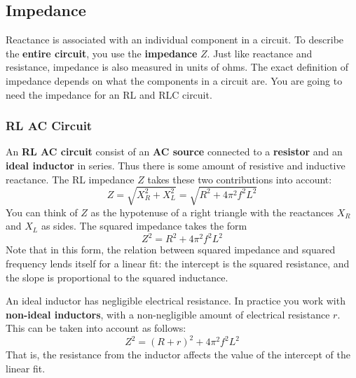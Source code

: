 \subsection{Impedance}
%
Reactance is associated with an individual component in a circuit. To describe the \textbf{entire circuit}, you use the \textbf{impedance} $Z$. Just like reactance and resistance, impedance is also measured in units of ohms. The exact definition of impedance depends on what the components in a circuit are. You are going to need the impedance for an RL and RLC circuit.
%
\subsubsection{RL AC Circuit}
%
An \textbf{RL AC circuit} consist of an \textbf{AC source} connected to a \textbf{resistor} and an \textbf{ideal inductor} in series. Thus there is some amount of resistive and inductive reactance. The RL impedance $Z$ takes these two contributions into account:
\begin{equation} \label{eq.06.impedance.RL}
	Z = \sqrt{X_{R}^{2} + X_{L}^{2}} = \sqrt{R^{2} + 4 \pi^{2} f^{2} L^{2}}
\end{equation}
You can think of $Z$ as the hypotenuse of a right triangle with the reactances $X_{R}$ and $X_{L}$ as sides. The squared impedance takes the form
\begin{equation} \label{eq.06.impedance.squared}
	Z^{2} = R^{2} + 4\pi^{2} f^{2} L^{2}
\end{equation}
Note that in this form, the relation between squared impedance and squared frequency lends itself for a linear fit: the intercept is the squared resistance, and the slope is proportional to the squared inductance.

An ideal inductor has negligible electrical resistance. In practice you work with \textbf{non-ideal inductors}, with a non-negligible amount of electrical resistance $r$. This can be taken into account as follows:
\begin{equation}
	Z^{2} = (R + r)^{2} + 4 \pi^{2} f^{2} L^{2}
\end{equation}
That is, the resistance from the inductor affects the value of the intercept of the linear fit.
%
